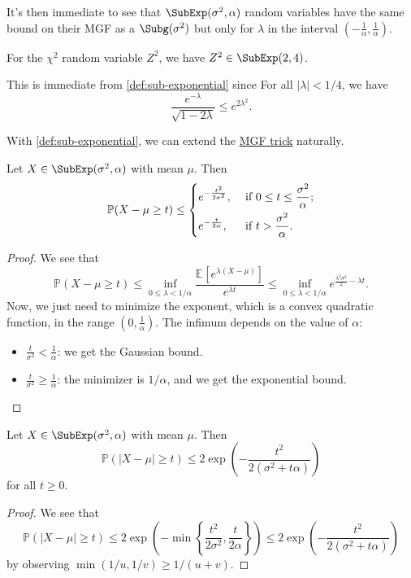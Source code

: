 It's then immediate to see that \(\SubExp(\sigma^2,\alpha)\) random variables have the same bound on their MGF as a \(\Subg(\sigma^2)\) but only for \(\lambda\) in the interval \((-\frac{1}{\alpha},\frac{1}{\alpha})\).

\begin{eg}
	For the \(\chi ^2\) random variable \(Z^2\), we have \(Z^2 \in \SubExp(2, 4) \).
\end{eg}
\begin{explanation}
	This is immediate from \autoref{def:sub-exponential} since For all \(\vert \lambda \vert < 1 / 4\), we have
	\[
		\frac{e^{-\lambda }}{\sqrt{1 - 2 \lambda } } \leq e^{2 \lambda ^{2} }.
	\]
\end{explanation}

With \autoref{def:sub-exponential}, we can extend the \hyperref[lma:MGF-trick]{MGF trick} naturally.

\begin{lemma}\label{lma:MGF-trick-SubExp}
	Let \(X \in \SubExp(\sigma ^{2} , \alpha ) \) with mean \(\mu \). Then
	\[
		\mathbb{P} (X - \mu \geq t) \leq
		\begin{dcases}
			e^{- \frac{t^2}{2 \sigma ^{2} }}, & \text{ if } 0 \leq t \leq \frac{\sigma ^{2}}{\alpha } ; \\
			e^{- \frac{t}{2\alpha }},         & \text{ if } t > \frac{\sigma ^{2} }{\alpha }.
		\end{dcases}
	\]
\end{lemma}
\begin{proof}
	We see that
	\[
		\mathbb{P} (X- \mu \geq t)
		\leq \inf _{0 \leq \lambda < 1 / \alpha } \frac{\mathbb{E}_{}\left[e^{\lambda (X - \mu )} \right] }{e^{\lambda t}}
		\leq \inf _{0 \leq \lambda < 1 / \alpha } e^{\frac{\lambda ^{2} \sigma ^{2} }{2} - \lambda t}.
	\]
	Now, we just need to minimize the exponent, which is a convex quadratic function, in the range \((0,\frac{1}{\alpha})\). The infimum depends on the value of \(\alpha\):
	\begin{itemize}
		\item \(\frac{t}{\sigma ^{2} } < \frac{1}{\alpha }\): we get the Gaussian bound.
		\item \(\frac{t}{\sigma ^{2} } \geq \frac{1}{\alpha }\): the minimizer is \(1 / \alpha \), and we get the exponential bound.
	\end{itemize}
\end{proof}

\begin{corollary}\label{col:MGF-trick-SubExp}
	Let \(X \in \SubExp(\sigma ^{2} , \alpha ) \) with mean \(\mu \). Then
	\[
		\mathbb{P} (\vert X - \mu  \vert \geq t) \leq 2 \exp \left( - \frac{t^2}{2(\sigma ^{2} + t \alpha )} \right)
	\]
	for all \(t \geq 0\).
\end{corollary}
\begin{proof}
	We see that
	\[
		\mathbb{P} (\vert X - \mu  \vert \geq t)
		\leq 2 \exp \left( - \min \left\{ \frac{t^2}{2 \sigma ^{2} }, \frac{t}{2\alpha } \right\}  \right)
		\leq 2 \exp \left( - \frac{t^2}{2(\sigma ^{2} + t \alpha )} \right)
	\]
	by observing \(\min (1 / u, 1 / v ) \geq 1 / (u + v)\).
\end{proof}

